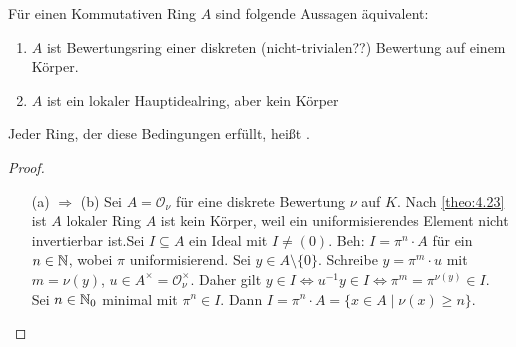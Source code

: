 \documentclass[../main.tex]{subfiles}
\begin{document}
\begin{theorem}%
    Für einen Kommutativen Ring $A$ sind folgende Aussagen äquivalent:
    \begin{enumerate}[label=(\alph*)]
        \item $A$ ist Bewertungsring einer diskreten (nicht-trivialen??) Bewertung auf einem Körper.
        \item $A$ ist ein lokaler Hauptidealring, aber kein Körper
    \end{enumerate}
    Jeder Ring, der diese Bedingungen erfüllt, heißt .
\end{theorem}
\begin{proof} $ $
    \begin{itemize}
        \item[(a) $\Rightarrow$ (b)]
        Sei $A=\mathcal{O}_\nu$ für eine diskrete Bewertung $\nu$ auf $K$.
        Nach \ref{theo:4.23} ist $A$ lokaler Ring
        $A$ ist kein Körper, weil ein uniformisierendes Element nicht invertierbar ist.
        Sei $I\subseteq A$ ein Ideal mit $I\neq (0)$.
        Beh: $I=\pi^n\cdot A$ für ein $n\in \mathbb{N}$, wobei $\pi$ uniformisierend.
        Sei $y\in A\setminus\{0\}$. Schreibe $y=\pi^m\cdot u$ mit $m=\nu(y)$, $u\in A^\times = \mathcal{O}_\nu^\times$.
        Daher gilt $y\in I\Leftrightarrow u^{-1}y\in I \Leftrightarrow \pi^m = \pi^{\nu(y)}\in I$.
        Sei $n\in \mathbb{N}_0$ minimal mit $\pi^n\in I$.
        Dann $I = \pi^n\cdot A = \{x\in A\mid \nu(x)\geq n\}$.
        

\end{itemize}
\end{proof}
\end{document}
